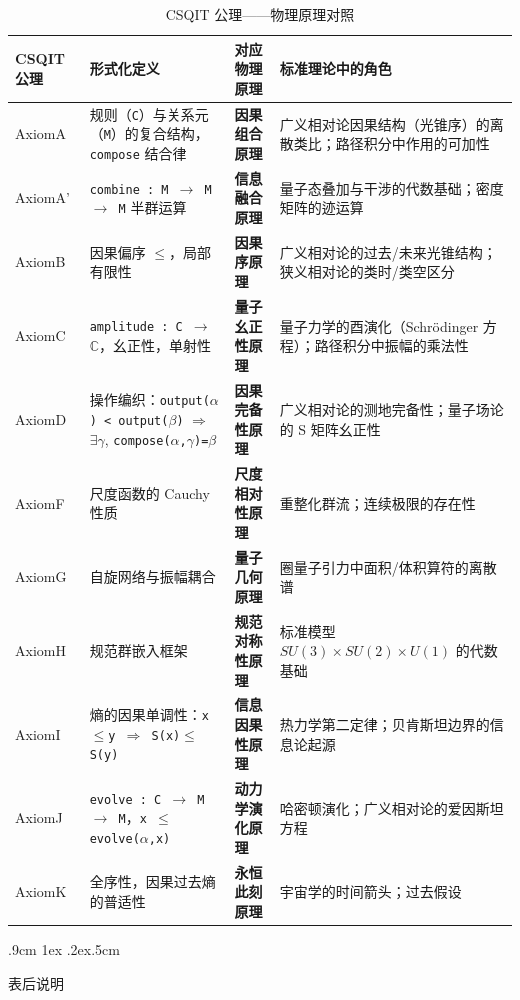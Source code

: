 \documentclass[aps,prd,twocolumn,nofootinbib,floatfix]{revtex4-2}
\makeatletter
\def\subsection{%
  \@startsection{subsection}{2}{\z@}
    {.9cm \@plus1ex \@minus .2ex}{.5cm}
    {\normalfont\large\bfseries\raggedright}%
}
\makeatother
\begin{document}
\begin{table}[!t]
\centering
\scriptsize
\begin{tabular}{|p{1.2cm}|p{2.8cm}|p{2.8cm}|p{3cm}|}
\hline
\textbf{CSQIT 公理} & \textbf{形式化定义} & \textbf{对应物理原理} & \textbf{标准理论中的角色} \\
\hline
AxiomA & 规则（\texttt{C}）与关系元（\texttt{M}）的复合结构，\texttt{compose} 结合律 & \textbf{因果组合原理} & 广义相对论因果结构（光锥序）的离散类比；路径积分中作用的可加性 \\
\hline
AxiomA' & \texttt{combine : M $\to$ M $\to$ M} 半群运算 & \textbf{信息融合原理} & 量子态叠加与干涉的代数基础；密度矩阵的迹运算 \\
\hline
AxiomB & 因果偏序 \texttt{$\leq$}，局部有限性 & \textbf{因果序原理} & 广义相对论的过去/未来光锥结构；狭义相对论的类时/类空区分 \\
\hline
AxiomC & \texttt{amplitude : C $\to$ $\mathbb{C}$}，幺正性，单射性 & \textbf{量子幺正性原理} & 量子力学的酉演化（Schr\"odinger 方程）；路径积分中振幅的乘法性 \\
\hline
AxiomD & 操作编织：\texttt{output($\alpha$) < output($\beta$)} $\Rightarrow$ $\exists\gamma$, \texttt{compose($\alpha$,$\gamma$)=$\beta$} & \textbf{因果完备性原理} & 广义相对论的测地完备性；量子场论的 S 矩阵幺正性 \\
\hline
AxiomF & 尺度函数的 Cauchy 性质 & \textbf{尺度相对性原理} & 重整化群流；连续极限的存在性 \\
\hline
AxiomG & 自旋网络与振幅耦合 & \textbf{量子几何原理} & 圈量子引力中面积/体积算符的离散谱 \\
\hline
AxiomH & 规范群嵌入框架 & \textbf{规范对称性原理} & 标准模型 $SU(3)\times SU(2)\times U(1)$ 的代数基础 \\
\hline
AxiomI & 熵的因果单调性：\texttt{x$\leq$y $\Rightarrow$ S(x)$\leq$S(y)} & \textbf{信息因果性原理} & 热力学第二定律；贝肯斯坦边界的信息论起源 \\
\hline
AxiomJ & \texttt{evolve : C $\to$ M $\to$ M}，\texttt{x $\leq$ evolve($\alpha$,x)} & \textbf{动力学演化原理} & 哈密顿演化；广义相对论的爱因斯坦方程 \\
\hline
AxiomK & 全序性，因果过去熵的普适性 & \textbf{永恒此刻原理} & 宇宙学的时间箭头；过去假设 \\
\hline
\end{tabular}
\caption{CSQIT 公理——物理原理对照}
\label{tab:axiom_physics}
\end{table}

\subsection{表后说明}
\end{document}
